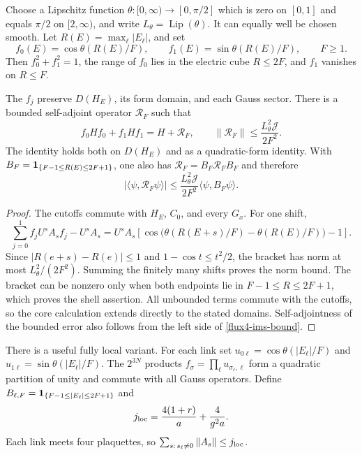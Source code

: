 Choose a Lipschitz function $\theta:[0,\infty)\to[0,\pi/2]$ which
is zero on $[0,1]$ and equals $\pi/2$ on $[2,\infty)$, and write
$L_\theta=\operatorname{Lip}(\theta)$.  It can equally well be chosen
smooth.  Let $R(E)=\max_\ell|E_\ell|$, and set
\begin{equation}
 f_0(E)=\cos\theta(R(E)/F),\qquad
 f_1(E)=\sin\theta(R(E)/F),\qquad F\ge1.
 \label{flux4-two-cutoffs}
\end{equation}
Then $f_0^2+f_1^2=1$, the range of $f_0$ lies in the electric cube
$R\le2F$, and $f_1$ vanishes on $R\le F$.

\begin{lemma}
\label{flux4-ims}
The $f_j$ preserve $D(H_E)$, its form domain, and each Gauss sector.
There is a bounded self-adjoint operator $\mathcal R_F$ such that
\begin{equation}
 f_0Hf_0+f_1Hf_1=H+\mathcal R_F,
 \qquad
 \|\mathcal R_F\|\le
       \frac{L_\theta^2\mathcal J}{2F^2}.
 \label{flux4-ims-bound}
\end{equation}
The identity holds both on $D(H_E)$ and as a quadratic-form identity.
With
$B_F={\bf1}_{\{F-1\le R(E)\le2F+1\}}$, one also has
$\mathcal R_F=B_F\mathcal R_FB_F$ and therefore
\begin{equation}
 |\langle\psi,\mathcal R_F\psi\rangle|
 \le\frac{L_\theta^2\mathcal J}{2F^2}
       \langle\psi,B_F\psi\rangle.
 \label{flux4-ims-shell}
\end{equation}
\end{lemma}
\begin{proof}
The cutoffs commute with $H_E$, $C_0$, and every $G_x$.
For one shift,
\[
 \sum_{j=0}^1 f_jU^sA_sf_j-U^sA_s
 =U^sA_s\left[
   \cos\big(\theta(R(E+s)/F)-\theta(R(E)/F)\big)-1\right].
\]
Since $|R(e+s)-R(e)|\le1$ and $1-\cos t\le t^2/2$,
the bracket has norm at most $L_\theta^2/(2F^2)$.
Summing the finitely many shifts proves the norm bound.
The bracket can be nonzero only when both endpoints lie in
$F-1\le R\le2F+1$, which proves the shell assertion.
All unbounded terms commute with the cutoffs, so the core calculation
extends directly to the stated domains.  Self-adjointness of the
bounded error also follows from the left side of
\eqref{flux4-ims-bound}.
\end{proof}

There is a useful fully local variant.  For each link set
$u_{0\ell}=\cos\theta(|E_\ell|/F)$ and
$u_{1\ell}=\sin\theta(|E_\ell|/F)$.  The $2^{3N}$ products
$f_\sigma=\prod_\ell u_{\sigma_\ell,\ell}$ form a quadratic
partition of unity and commute with all Gauss operators.  Define
$B_{\ell,F}={\bf1}_{\{F-1\le|E_\ell|\le2F+1\}}$ and
\begin{equation}
 j_{\rm loc}=\frac{4(1+r)}a+\frac4{g^2a}.
 \label{flux4-local-shift-constant}
\end{equation}
Each link meets four plaquettes, so
$\sum_{s:\,s_\ell\ne0}\|A_s\|\le j_{\rm loc}$.

